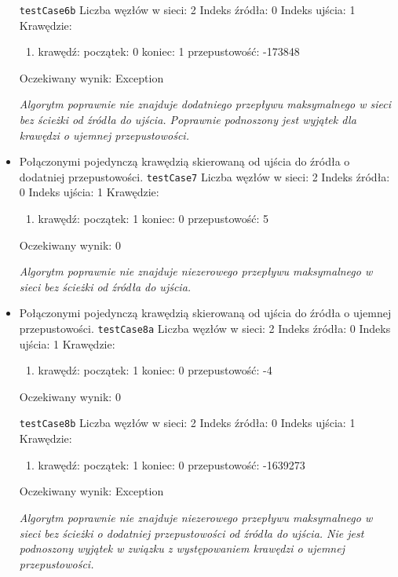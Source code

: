\begin{itemize}[nosep]
    \texttt{testCase6b}
    Liczba węzłów w sieci: 2
    Indeks źródła: 0
    Indeks ujścia: 1
    Krawędzie:
    \begin{enumerate}[nosep]
        \item krawędź:
        początek: 0
        koniec: 1
        przepustowość: -173848
    \end{enumerate}
    Oczekiwany wynik: Exception

    \emph{Algorytm poprawnie nie znajduje
    dodatniego przepływu maksymalnego w sieci bez ścieżki od źródła do ujścia. Poprawnie
    podnoszony jest wyjątek dla krawędzi o ujemnej przepustowości.}

    \item Połączonymi pojedynczą krawędzią skierowaną od ujścia do źródła o dodatniej przepustowości.
    \texttt{testCase7}
    Liczba węzłów w sieci: 2
    Indeks źródła: 0
    Indeks ujścia: 1
    Krawędzie:
    \begin{enumerate}[nosep]
        \item krawędź:
        początek: 1
        koniec: 0
        przepustowość: 5
    \end{enumerate}
    Oczekiwany wynik: 0

    \emph{Algorytm poprawnie nie znajduje niezerowego
    przepływu maksymalnego w sieci bez ścieżki od źródła do ujścia.}

    \item Połączonymi pojedynczą krawędzią skierowaną od ujścia do źródła o ujemnej przepustowości.
    \texttt{testCase8a}
    Liczba węzłów w sieci: 2
    Indeks źródła: 0
    Indeks ujścia: 1
    Krawędzie:
    \begin{enumerate}[nosep]
        \item krawędź:
        początek: 1
        koniec: 0
        przepustowość: -4
    \end{enumerate}
    Oczekiwany wynik: 0

    \texttt{testCase8b}
    Liczba węzłów w sieci: 2
    Indeks źródła: 0
    Indeks ujścia: 1
    Krawędzie:
    \begin{enumerate}[nosep]
        \item krawędź:
        początek: 1
        koniec: 0
        przepustowość: -1639273
    \end{enumerate}
    Oczekiwany wynik: Exception

    \emph{Algorytm poprawnie nie znajduje
    niezerowego przepływu maksymalnego w sieci bez ścieżki o dodatniej
    przepustowości od źródła do ujścia. Nie jest podnoszony wyjątek
    w związku z występowaniem krawędzi o ujemnej przepustowości.}


\end{itemize}
